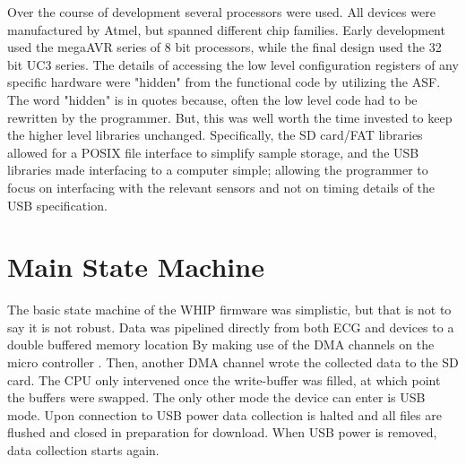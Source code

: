 Over the course of development several processors were used. All devices were manufactured by Atmel, but spanned different chip families. Early development used the megaAVR series of 8 bit processors, while the final design used the 32 bit UC3 series. The details of accessing the low level configuration registers of any specific hardware were "hidden" from the functional code by utilizing the ASF. The word "hidden" is in quotes because, often the low level code had to be rewritten by the programmer. But, this was well worth the time invested to keep the higher level libraries unchanged. Specifically, the SD card/FAT libraries allowed for a POSIX file interface to simplify sample storage, and the USB libraries made interfacing to a computer simple; allowing the programmer to focus on interfacing with the relevant sensors and not on timing details of the USB specification.

\section{Main State Machine}

The basic state machine of the WHIP firmware was simplistic, but that is not to say it is not robust. Data was pipelined directly from both ECG and  devices to a double buffered memory location By making use of the DMA channels on the micro controller . Then, another DMA channel wrote the collected data to the SD card. The CPU only intervened once the write-buffer was filled, at which point the buffers were swapped. The only other mode the device can enter is USB mode. Upon connection to USB power data collection is halted and all files are flushed and closed in preparation for download. When USB power is removed, data collection starts again. 


